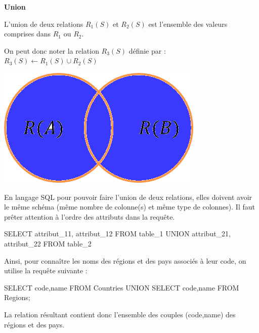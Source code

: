 \documentclass[10pt,fleqn]{article} %
\begin{document}
\begin{defi}
\begin{minipage}[c]{.75\linewidth}
\textbf{Union}

L'union de deux relations $R_1(S)$ et $R_2(S)$ est l'ensemble des valeurs comprises dans $R_1$ ou $R_2$. 

On peut donc noter la relation $R_3(S)$ définie par : $R_3(S)\leftarrow R_1(S)\cup R_2(S)$
\end{minipage}\hfill
\begin{minipage}[c]{.2\linewidth}
\begin{center}
\includegraphics[width=.95\textwidth]{images/union}
\end{center}
\end{minipage}

\end{defi}

\begin{envsql}
En langage SQL pour pouvoir faire l'union de deux relations, elles doivent avoir le même schéma (même nombre de colonne(s) et même type de colonnes). Il faut prêter attention à l'ordre des attributs dans la requête. 

\begin{sql}
SELECT  attribut_11, attribut_12 FROM table_1 UNION attribut_21, attribut_22 FROM table_2
\end{sql}
\end{envsql}

\begin{exemple}
Ainsi, pour connaître les noms des régions et des pays associés à leur code, on utilise la requête suivante :

\ifprof
\begin{envsql}
\begin{sql}
SELECT code,name FROM Countries UNION SELECT code,name FROM Regions;
\end{sql}
\end{envsql}
\else
\vspace{3cm}
\fi

La relation résultant contient donc l'ensemble des couples (code,name) des régions et des  pays. 
\end{exemple}
\end{document}
